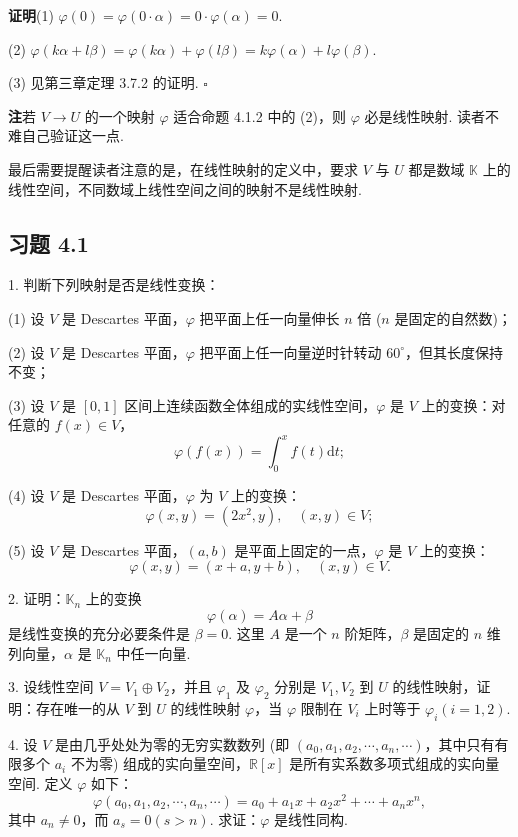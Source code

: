 \documentclass[UTF8, 12pt, fontset=fandol, oneside]{ctexart}
\begin{document}
\noindent\textbf{证明}\quad (1) $\varphi(0)=\varphi(0\cdot\alpha)=0\cdot\varphi(\alpha)=0$.

(2) $\varphi(k\alpha+l\beta)=\varphi(k\alpha)+\varphi(l\beta)=k\varphi(\alpha)+l\varphi(\beta)$.

(3) 见第三章定理 3.7.2 的证明. $\square$

\noindent\textbf{注}\quad 若 $V\to U$ 的一个映射 $\varphi$ 适合命题 4.1.2 中的 (2)，则 $\varphi$ 必是线性映射. 读者不难自己验证这一点.

最后需要提醒读者注意的是，在线性映射的定义中，要求 $V$ 与 $U$ 都是数域 $\mathbb{K}$ 上的线性空间，不同数域上线性空间之间的映射不是线性映射.

\subsection*{习题 4.1}

1. 判断下列映射是否是线性变换：

(1) 设 $V$ 是 Descartes 平面，$\varphi$ 把平面上任一向量伸长 $n$ 倍 ($n$ 是固定的自然数)；

(2) 设 $V$ 是 Descartes 平面，$\varphi$ 把平面上任一向量逆时针转动 $60^\circ$，但其长度保持不变；

(3) 设 $V$ 是 $[0,1]$ 区间上连续函数全体组成的实线性空间，$\varphi$ 是 $V$ 上的变换：对任意的 $f(x)\in V$，
\[
\varphi(f(x))=\int_0^x f(t)\mathrm{d}t;
\]

(4) 设 $V$ 是 Descartes 平面，$\varphi$ 为 $V$ 上的变换：
\[
\varphi(x,y)=(2x^2,y),\quad (x,y)\in V;
\]

(5) 设 $V$ 是 Descartes 平面，$(a,b)$ 是平面上固定的一点，$\varphi$ 是 $V$ 上的变换：
\[
\varphi(x,y)=(x+a,y+b),\quad (x,y)\in V.
\]

2. 证明：$\mathbb{K}_n$ 上的变换
\[
\varphi(\alpha)=A\alpha+\beta
\]
是线性变换的充分必要条件是 $\beta=0$. 这里 $A$ 是一个 $n$ 阶矩阵，$\beta$ 是固定的 $n$ 维列向量，$\alpha$ 是 $\mathbb{K}_n$ 中任一向量.

3. 设线性空间 $V=V_1\oplus V_2$，并且 $\varphi_1$ 及 $\varphi_2$ 分别是 $V_1,V_2$ 到 $U$ 的线性映射，证明：存在唯一的从 $V$ 到 $U$ 的线性映射 $\varphi$，当 $\varphi$ 限制在 $V_i$ 上时等于 $\varphi_i(i=1,2)$.

4. 设 $V$ 是由几乎处处为零的无穷实数数列 (即 $(a_0,a_1,a_2,\cdots,a_n,\cdots)$，其中只有有限多个 $a_i$ 不为零) 组成的实向量空间，$\mathbb{R}[x]$ 是所有实系数多项式组成的实向量空间. 定义 $\varphi$ 如下：
\[
\varphi(a_0,a_1,a_2,\cdots,a_n,\cdots)=a_0+a_1x+a_2x^2+\cdots+a_nx^n,
\]
其中 $a_n\neq 0$，而 $a_s=0(s>n)$. 求证：$\varphi$ 是线性同构.
\end{document}
